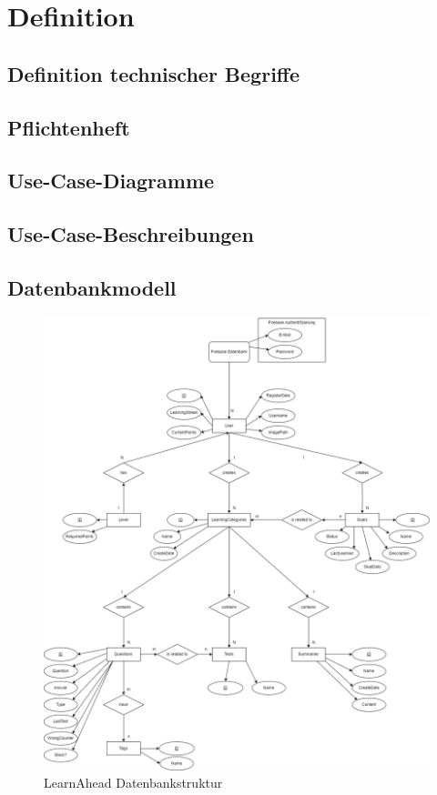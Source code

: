 \section{Definition}
\subsection{Definition technischer Begriffe}
\subsection{Pflichtenheft}
\subsection{Use-Case-Diagramme}
\subsection{Use-Case-Beschreibungen}
\subsection{Datenbankmodell}
\begin{figure}[H]
    \centering
    \includegraphics[width=1\textwidth]{images/LernAhead Datenbankstruktur.png}
    \caption{LearnAhead Datenbankstruktur}
    \label{fig:LearnAheadDatenbankstruktur}
\end{figure}\noindent
